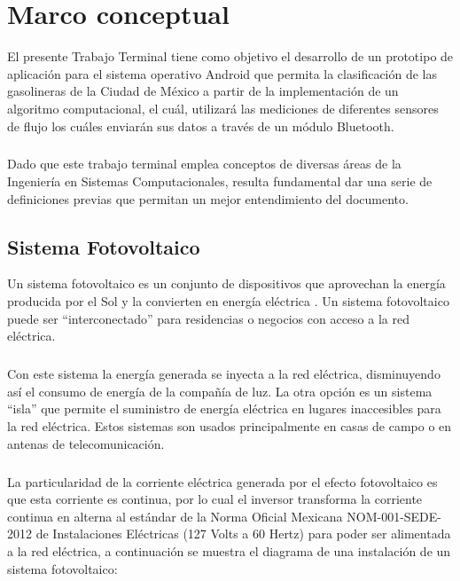 
\chapter{Marco conceptual}\label{chapter2}
El presente Trabajo Terminal tiene como objetivo el desarrollo de un prototipo de aplicación para el sistema operativo Android que permita la clasificación de las gasolineras de la Ciudad de México a partir de la implementación de un algoritmo computacional, el cuál, utilizará las mediciones de diferentes sensores de flujo los cuáles enviarán sus datos a través de un módulo Bluetooth.
\paragraph{}
Dado que este trabajo terminal emplea conceptos de diversas áreas de la Ingeniería en Sistemas Computacionales, resulta fundamental dar una serie de definiciones previas que permitan un mejor entendimiento del documento.

\section{Sistema Fotovoltaico}
Un sistema fotovoltaico es un conjunto de dispositivos que aprovechan la energía producida por el Sol y la convierten en energía eléctrica \citep{MarcoTeorico1}. Un sistema fotovoltaico puede ser “interconectado” para residencias o negocios con acceso a la red eléctrica. 

\paragraph{}
Con este sistema la energía generada se inyecta a la red eléctrica, disminuyendo así el consumo de energía de la compañía de luz. La otra opción es un sistema “isla” que permite el suministro de energía eléctrica en lugares inaccesibles para la red eléctrica. Estos sistemas son usados principalmente en casas de campo o en antenas de telecomunicación.
\paragraph{}
La particularidad de la corriente eléctrica generada por el efecto fotovoltaico es que esta corriente es continua, por lo cual el inversor transforma la corriente continua en alterna al estándar de la Norma Oficial Mexicana NOM-001-SEDE-2012 de Instalaciones Eléctricas (127 Volts a 60 Hertz) \citep{NORMA-Electrica} para poder ser alimentada a la red eléctrica, a continuación se muestra el diagrama de una instalación de un sistema fotovoltaico:

